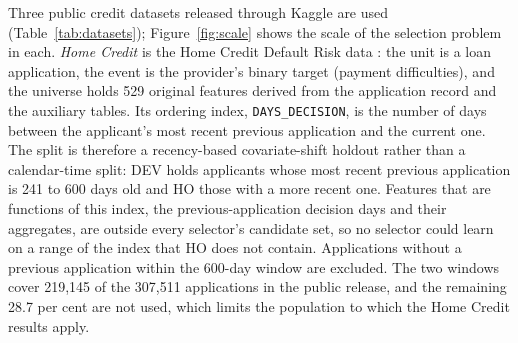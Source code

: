 \documentclass[final,5p,twocolumn]{elsarticle}
\begin{document}
Three public credit datasets released through Kaggle are used (Table~\ref{tab:datasets}); Figure~\ref{fig:scale} shows the scale of the selection problem in each. \emph{Home Credit} is the Home Credit Default Risk data \cite{homecredit2018}: the unit is a loan application, the event is the provider's binary target (payment difficulties), and the universe holds 529 original features derived from the application record and the auxiliary tables. Its ordering index, \texttt{DAYS\_DECISION}, is the number of days between the applicant's most recent previous application and the current one. The split is therefore a recency-based covariate-shift holdout rather than a calendar-time split: DEV holds applicants whose most recent previous application is 241 to 600 days old and HO those with a more recent one. Features that are functions of this index, the previous-application decision days and their aggregates, are outside every selector's candidate set, so no selector could learn on a range of the index that HO does not contain. Applications without a previous application within the 600-day window are excluded. The two windows cover 219,145 of the 307,511 applications in the public release, and the remaining 28.7 per cent are not used, which limits the population to which the Home Credit results apply.
\end{document}
